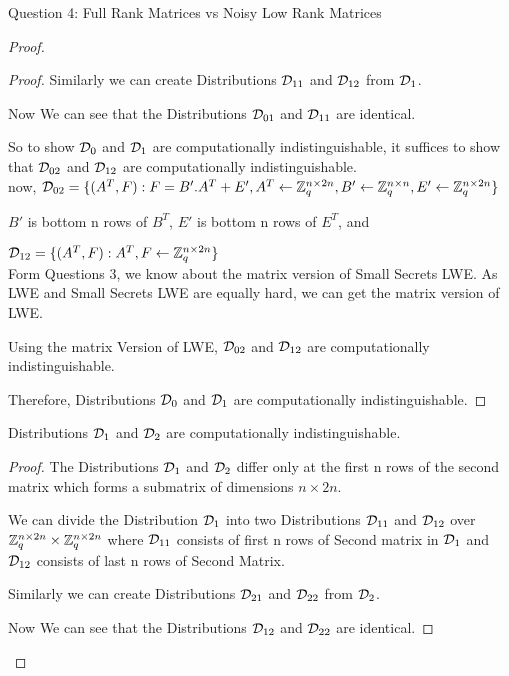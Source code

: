 \begin{solution}{Question 4: Full Rank Matrices vs Noisy Low Rank Matrices}
\begin{proof}
\begin{proof}
         Similarly we can create Distributions $\mathcal{D}_{11}$ and $\mathcal{D}_{12}$ from $\mathcal{D}_{1}$.

         Now We can see that the Distributions $\mathcal{D}_{01}$ and $\mathcal{D}_{11}$ are identical.

         So to show $\mathcal{D}_0$ and $\mathcal{D}_1$ are computationally indistinguishable, it suffices to show that $\mathcal{D}_{02}$ and $\mathcal{D}_{12}$ are computationally indistinguishable.\\

         now, $\mathcal{D}_{02} = \{ (A^T,F): F = B' . A^T + E', A^T \leftarrow \mathbb{Z}_q^{n\times 2n}, B' \leftarrow \mathbb{Z}_q^{n\times n}, E' \leftarrow \mathbb{Z}_q^{n\times 2n}\}$

         $B'$ is bottom n rows of $B^T$, $E'$ is bottom n rows of $E^T$, and 
         
         $\mathcal{D}_{12} = \{ (A^T,F):  A^T,F \leftarrow \mathbb{Z}_q^{n\times 2n} \}$\\

         Form Questions 3, we know about the matrix version of Small Secrets LWE. As LWE and Small Secrets LWE are equally hard, we can get the matrix version of LWE.

        Using the matrix Version of LWE, $\mathcal{D}_{02}$ and $\mathcal{D}_{12}$ are computationally indistinguishable.

        Therefore, Distributions $\mathcal{D}_0$ and $\mathcal{D}_1$ are computationally indistinguishable.
         
     \end{proof}
    
\begin{claim}
     Distributions $\mathcal{D}_1$ and $\mathcal{D}_2$ are computationally indistinguishable.
     \end{claim}

    \begin{proof}
        The Distributions $\mathcal{D}_1$ and $\mathcal{D}_2$ differ only at the first n rows of the second matrix which forms a submatrix of dimensions $n \times 2n$.

         We can divide the Distribution $\mathcal{D}_1$ into two Distributions $\mathcal{D}_{11}$ and $\mathcal{D}_{12}$ over $\mathbb{Z}_q^{n\times 2n} \times \mathbb{Z}_q^{n\times 2n}$ where $\mathcal{D}_{11}$ consists of first n rows of Second matrix in $\mathcal{D}_1$ and $\mathcal{D}_{12}$ consists of last n rows of Second Matrix.

         Similarly we can create Distributions $\mathcal{D}_{21}$ and $\mathcal{D}_{22}$ from $\mathcal{D}_{2}$.

         Now We can see that the Distributions $\mathcal{D}_{12}$ and $\mathcal{D}_{22}$ are identical.


\end{proof}
\end{proof}
\end{solution}
